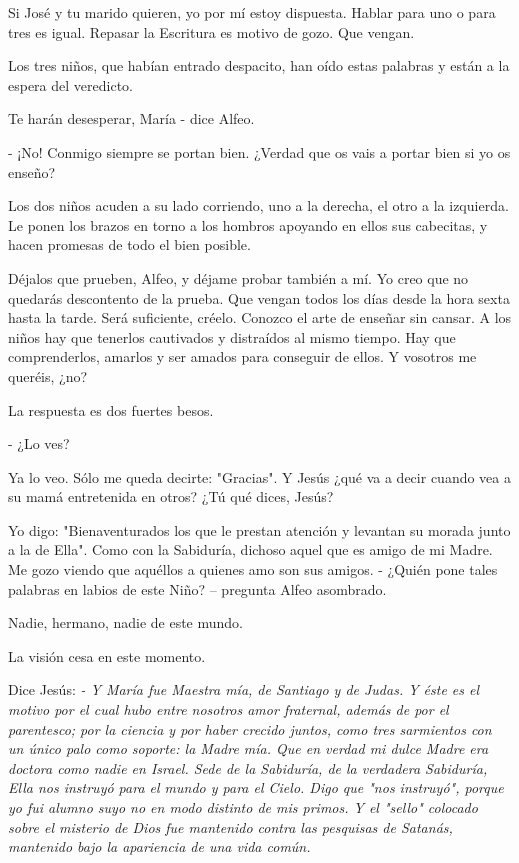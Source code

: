 \documentclass[12pt]{book} %
\begin{document}
Si José y tu marido quieren, yo por mí estoy dispuesta. Hablar para uno o para tres es igual. Repasar la Escritura es motivo de gozo. Que vengan. 

Los tres niños, que habían entrado despacito, han oído estas palabras y están a la espera del veredicto. 

Te harán desesperar, María - dice Alfeo. 

- ¡No! Conmigo siempre se portan bien. ¿Verdad que os vais a portar bien si yo os enseño? 

Los dos niños acuden a su lado corriendo, uno a la derecha, el otro a la izquierda. Le ponen los brazos en torno a los hombros apoyando en ellos sus cabecitas, y hacen promesas de todo el bien posible. 

Déjalos que prueben, Alfeo, y déjame probar también a mí. Yo creo que no quedarás descontento de la prueba. Que vengan todos los días desde la hora sexta hasta la tarde. Será suficiente, créelo. Conozco el arte de enseñar sin cansar. A los niños hay que tenerlos cautivados y distraídos al mismo tiempo. Hay que comprenderlos, amarlos y ser amados para conseguir de ellos. Y vosotros me queréis, ¿no? 

La respuesta es dos fuertes besos. 

- ¿Lo ves? 

Ya lo veo. Sólo me queda decirte: "Gracias". Y Jesús ¿qué va a decir cuando vea a su mamá entretenida en otros? ¿Tú qué dices, Jesús? 

Yo digo: "Bienaventurados los que le prestan atención y levantan su morada junto a la de Ella". Como con la Sabiduría, dichoso aquel que es amigo de mi Madre. Me gozo viendo que aquéllos a quienes amo son sus amigos. - ¿Quién pone tales palabras en labios de este Niño? – pregunta Alfeo asombrado. 

Nadie, hermano, nadie de este mundo. 

La visión cesa en este momento. 

Dice Jesús: 
\emph{- Y María fue Maestra mía, de Santiago y de Judas. Y éste es el motivo por el cual hubo entre nosotros amor fraternal, además de por el parentesco; por la ciencia y por haber crecido juntos, como tres sarmientos con un único palo como soporte: la Madre mía. Que en verdad mi dulce Madre era doctora como nadie en Israel. Sede de la Sabiduría, de la verdadera Sabiduría, Ella nos instruyó para el mundo y para el Cielo. Digo que "nos instruyó", porque yo fui alumno suyo no en modo distinto de mis primos. Y el "sello" colocado sobre el misterio de Dios fue mantenido contra las pesquisas de Satanás, mantenido bajo la apariencia de una vida común.}
\end{document}
